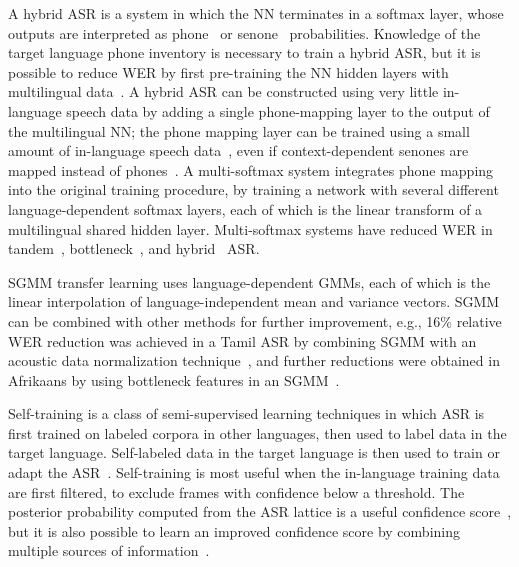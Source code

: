 A hybrid ASR is a system in which the NN terminates in a softmax
layer, whose outputs are interpreted as phone~\cite{Morgan95} or
senone~\cite{Dahl2012} probabilities.  Knowledge of the target
language phone inventory is necessary to train a hybrid ASR, but it is
possible to reduce WER by first pre-training the NN hidden layers with
multilingual data~\cite{Huang2013,Swietojanski2012}.  A hybrid ASR can be
constructed using very little in-language speech data by adding a
single phone-mapping layer to the output of the multilingual NN; the
phone mapping layer can be trained using a small amount of in-language
speech data~\cite{Sim2008}, even if context-dependent senones are
mapped instead of phones~\cite{Do2012}.  A multi-softmax system
integrates phone mapping into the original training procedure, by
training a network with several different language-dependent softmax
layers, each of which is the linear transform of a multilingual shared
hidden layer.  Multi-softmax systems have reduced WER in
tandem~\cite{Scanzio2008}, bottleneck~\cite{Vesely2012}, and
hybrid~\cite{Huang2013} ASR.

SGMM transfer learning uses language-dependent GMMs, each of which is
the linear interpolation of language-independent mean and variance
vectors.  SGMM can be combined with other methods for further
improvement, e.g., 16\% relative WER reduction was achieved in a Tamil
ASR by combining SGMM with an acoustic data normalization
technique~\cite{Mohan2014}, and further reductions were obtained in
Afrikaans by using bottleneck features in an SGMM~\cite{Imseng2014}.

Self-training is a class of semi-supervised learning techniques in
which ASR is first trained on labeled corpora in other languages, then
used to label data in the target language.  Self-labeled data in the
target language is then used to train or adapt the
ASR~\cite{Loof2009,Cetin2008}.  Self-training is most useful when the
in-language training data are first filtered, to exclude frames with
confidence below a threshold.  The posterior probability computed from
the ASR lattice is a useful confidence score~\cite{vesely2013-semi},
but it is also possible to learn an improved confidence score by
combining multiple sources of information~\cite{Vu2011b}.

